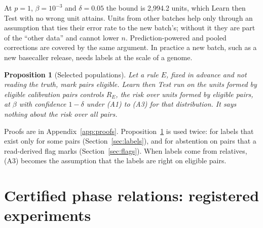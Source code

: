 \documentclass[11pt]{article}
\newtheorem{proposition}{Proposition}
\theoremstyle{definition}
\theoremstyle{remark}
\begin{document}
At $p=1$, $\beta=10^{-3}$ and $\delta=0.05$ the bound is 2{,}994.2 units, which
Learn then Test with no wrong unit attains. Units from other batches help
only through an assumption that ties their error rate to the new batch's;
without it they are part of the ``other data'' and cannot lower $n$.
Prediction-powered and pooled corrections are covered by the same argument.
In practice a new batch, such as a new basecaller release, needs labels at
the scale of a genome.

\begin{proposition}[Selected populations]\label{prop:select}
Let a rule $E$, fixed in advance and not reading the truth, mark pairs
eligible. Learn then Test run on the units formed by eligible calibration
pairs controls $R_E$, the risk over units formed by eligible pairs, at
$\beta$ with confidence $1-\delta$ under (A1) to (A3) for that distribution.
It says nothing about the risk over all pairs.
\end{proposition}

Proofs are in Appendix~\ref{app:proofs}. Proposition~\ref{prop:select} is
used twice: for labels that exist only for some pairs
(Section~\ref{sec:labels}), and for abstention on pairs that a read-derived
flag marks (Section~\ref{sec:flags}). When labels come from relatives, (A3)
becomes the assumption that the labels are right on eligible pairs.

\section{Certified phase relations: registered experiments}\label{sec:design}
\end{document}
